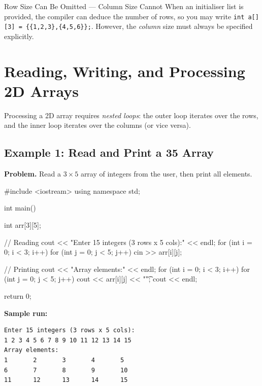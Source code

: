 \begin{warningbox}{Row Size Can Be Omitted --- Column Size Cannot}
When an initialiser list is provided, the compiler can deduce the number
of rows, so you may write
\texttt{int a[][3] = \{\{1,2,3\},\{4,5,6\}\};}. However, the
\emph{column} size must always be specified explicitly.
\end{warningbox}

\section{Reading, Writing, and Processing 2D Arrays}
\label{sec:rwp-2d-arrays}

Processing a 2D array requires \emph{nested loops}: the outer loop iterates
over the rows, and the inner loop iterates over the columns (or vice versa).

\subsection{Example 1: Read and Print a
            3\texorpdfstring{\texttimes}{x}5 Array}

\textbf{Problem.} Read a $3 \times 5$ array of integers from the user,
then print all elements.

\begin{cppcode}
#include <iostream>
using namespace std;

int main() {
    int arr[3][5];

    // Reading
    cout << "Enter 15 integers (3 rows x 5 cols):"
         << endl;
    for (int i = 0; i < 3; i++) {
        for (int j = 0; j < 5; j++) {
            cin >> arr[i][j];
        }
    }

    // Printing
    cout << "Array elements:" << endl;
    for (int i = 0; i < 3; i++) {
        for (int j = 0; j < 5; j++) {
            cout << arr[i][j] << "\t";
        }
        cout << endl;
    }

    return 0;
}
\end{cppcode}

\textbf{Sample run:}
\begin{verbatim}
Enter 15 integers (3 rows x 5 cols):
1 2 3 4 5 6 7 8 9 10 11 12 13 14 15
Array elements:
1       2       3       4       5
6       7       8       9       10
11      12      13      14      15
\end{verbatim}

